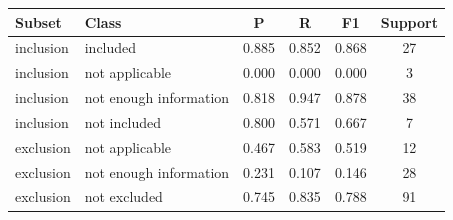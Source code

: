 \begin{tabular}{llcccc}\toprule Subset & Class & P & R & F1 & Support\\\midrule
inclusion & included & 0.885 & 0.852 & 0.868 & 27\\
inclusion & not applicable & 0.000 & 0.000 & 0.000 & 3\\
inclusion & not enough information & 0.818 & 0.947 & 0.878 & 38\\
inclusion & not included & 0.800 & 0.571 & 0.667 & 7\\
exclusion & not applicable & 0.467 & 0.583 & 0.519 & 12\\
exclusion & not enough information & 0.231 & 0.107 & 0.146 & 28\\
exclusion & not excluded & 0.745 & 0.835 & 0.788 & 91\\
\bottomrule\end{tabular}
